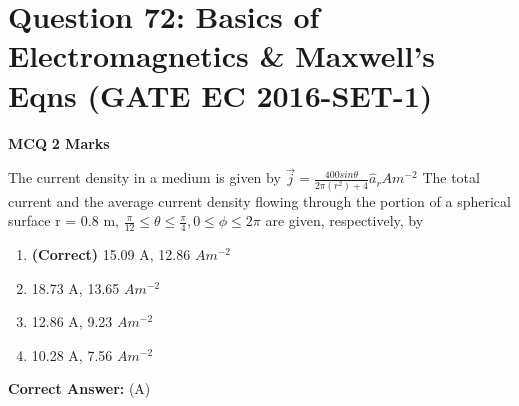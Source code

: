 \documentclass[11pt,a4paper]{article}
\begin{document}
\section*{Question 72: Basics of Electromagnetics \& Maxwell's Eqns (GATE EC 2016-SET-1)}
\noindent \textbf{\color{primary}MCQ} \hfill \textbf{\color{secondary}2 Marks}


\noindent The current density in a medium is given by 
 $\vec{j}=\frac{400 sin\theta }{2\pi (r^{2})+4}\hat{a}_{r}Am^{-2}$
 The total current and the average current density flowing through the portion of a spherical surface r = 0.8 m, $\frac{\pi }{12}\leq \theta \leq \frac{\pi }{4},0\leq \phi \leq 2\pi$ are given, respectively, by


\begin{enumerate}[label=(\Alph*)]
    \item \textbf{(Correct)} 15.09 A, 12.86 $Am^{-2}$
    \item 18.73 A, 13.65 $Am^{-2}$
    \item 12.86 A, 9.23 $Am^{-2}$
    \item 10.28 A, 7.56 $Am^{-2}$
\end{enumerate}

\noindent \textbf{Correct Answer:} (A)
\end{document}
